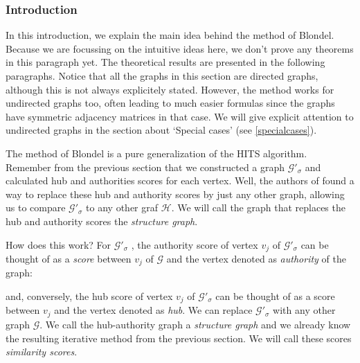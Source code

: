 \documentclass[a4paper,11pt]{report}
\newcommand{\graf}{\mathscr{G}}
\newcommand{\grafeen}{\mathscr{H}}
\begin{document}
\subsubsection{Introduction}
In this introduction, we explain the main idea behind the method of Blondel. Because we are focussing on the intuitive ideas here, 
we don't prove any theorems in this paragraph yet. The theoretical results are 
presented in the following paragraphs. Notice that all the graphs in this 
section are directed graphs, although this is not always explicitely stated. 
However, the method works for undirected graphs too, often leading to much 
easier formulas since the graphs have symmetric adjacency matrices 
in that case. We will give explicit attention to undirected graphs in the 
section about `Special cases' (see \ref{specialcases}).

The method of Blondel is a pure 
generalization of the HITS algorithm. Remember from the previous section that we 
constructed a graph $\graf'_\sigma$ and calculated hub and authorities scores 
for each vertex. Well, the authors of \cite{blondel} found a way to replace these hub and authority 
scores by just any other graph, allowing us to compare $\graf'_\sigma$ to any other 
graf $\grafeen$. We will call the graph that replaces the hub and authority 
scores the \textit{structure graph}.


How does this work? For $\graf'_\sigma$ , the authority score of vertex $v_j$ of $\graf'_\sigma$  can be thought of as a \emph{score} between $v_j$ of $\graf$ 
and the vertex denoted as \emph{authority} of the graph:

\begin{center}
\end{center}
and, conversely, the hub score of vertex $v_j$ of $\graf'_\sigma$  can be thought of as a 
score between $v_j$ and the vertex denoted as \emph{hub}. We can replace $\graf'_\sigma$  with any other graph
$\graf$. We call the hub-authority graph a 
\emph{structure graph} and we already know the resulting iterative method from the previous section. 
We will call these scores \emph{similarity scores}.
\end{document}
